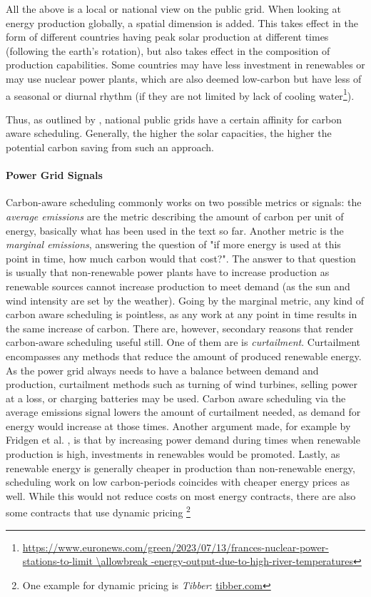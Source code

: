 All the above is a local or national view on the public grid. 
When looking at energy production globally, a spatial dimension is added. 
This takes effect in the form of different countries having peak solar production at different times (following the earth's rotation), but also takes effect in the composition of production capabilities.
Some countries may have less investment in renewables or may use nuclear power plants, which are also deemed low-carbon but have less of a seasonal or diurnal rhythm (if they are not limited by lack of cooling water\footnote{\url{https://www.euronews.com/green/2023/07/13/frances-nuclear-power-stations-to-limit \allowbreak -energy-output-due-to-high-river-temperatures}}).

Thus, as outlined by \cite{wiesner_lets_2021}, national public grids have a certain affinity for carbon aware scheduling. Generally, the higher the solar capacities, the higher the potential carbon saving from such an approach. 

\paragraph{Power Grid Signals}
Carbon-aware scheduling commonly works on two possible metrics or signals: the \emph{average emissions} are the metric describing the amount of carbon per unit of energy, basically what has been used in the text so far. Another metric is the \emph{marginal emissions}, answering the question of "if more energy is used at this point in time, how much carbon would that cost?". 
The answer to that question is usually that non-renewable power plants have to increase production as renewable sources cannot increase production to meet demand (as the sun and wind intensity are set by the weather). 
Going by the marginal metric, any kind of carbon aware scheduling is pointless, as any work at any point in time results in the same increase of carbon. 
There are, however, secondary reasons that render carbon-aware scheduling useful still. 
One of them are is \emph{curtailment}. 
Curtailment encompasses any methods that reduce the amount of produced renewable energy. As the power grid always needs to have a balance between demand and production, curtailment methods such as turning of wind turbines, selling power at a loss, or charging batteries may be used. 
Carbon aware scheduling via the average emissions signal lowers the amount of curtailment needed, as demand for energy would increase at those times.
Another argument made, for example by Fridgen et al. \cite{fridgen_not_2021}, is that by increasing power demand during times when renewable production is high, investments in renewables would be promoted. 
Lastly, as renewable energy is generally cheaper in production than non-renewable energy, scheduling work on low carbon-periods coincides with cheaper energy prices as well. While this would not reduce costs on most energy contracts, there are also some contracts that use dynamic pricing \footnote{One example for dynamic pricing is \emph{Tibber}: \url{tibber.com}}

